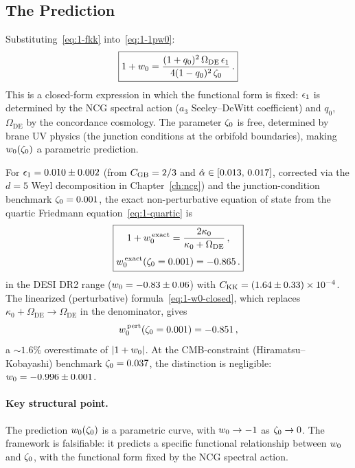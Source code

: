 \subsection{The Prediction}
\label{sec:1-prediction-w0}

Substituting~\eqref{eq:1-fkk} into~\eqref{eq:1-1pw0}:
\begin{equation}
\label{eq:1-w0-closed}
\boxed{1 + w_0 = \frac{(1+q_0)^2\,\Omega_{\mathrm{DE}}\,\epsilon_1}{4(1 - q_0)^2\,\zeta_0}\,.}
\end{equation}
This is a closed-form expression in which the functional form is fixed: $\epsilon_1$ is determined by the NCG spectral action ($a_3$ Seeley--DeWitt coefficient) and $q_0$, $\Omega_{\mathrm{DE}}$ by the concordance cosmology. The parameter $\zeta_0$ is free, determined by brane UV physics (the junction conditions at the orbifold boundaries), making $w_0(\zeta_0)$ a parametric prediction.

For $\epsilon_1 = 0.010 \pm 0.002$ (from $C_{\mathrm{GB}} = 2/3$ and $\hat{\alpha} \in [0.013,\, 0.017]$, corrected via the $d = 5$ Weyl decomposition in Chapter~\ref{ch:ncg}) and the junction-condition benchmark $\zeta_0 = 0.001$, the exact non-perturbative equation of state from the quartic Friedmann equation~\eqref{eq:1-quartic} is
\begin{equation}
\label{eq:1-w0-nonpert}
\boxed{\begin{gathered}
1 + w_0^{\,\mathrm{exact}} = \frac{2\kappa_0}{\kappa_0 + \Omega_{\mathrm{DE}}}\,,\\[4pt]
w_0^{\,\mathrm{exact}}(\zeta_0 = 0.001) = -0.865\,.
\end{gathered}}
\end{equation}
in the DESI DR2 range ($w_0 = -0.83 \pm 0.06$) with $C_{\mathrm{KK}} = (1.64 \pm 0.33) \times 10^{-4}$. The linearized (perturbative) formula~\eqref{eq:1-w0-closed}, which replaces $\kappa_0 + \Omega_{\mathrm{DE}} \to \Omega_{\mathrm{DE}}$ in the denominator, gives
\begin{equation}
\label{eq:1-w0-value}
w_0^{\,\mathrm{pert}}(\zeta_0 = 0.001) = -0.851\,,
\end{equation}
a ${\sim}1.6\%$ overestimate of $|1 + w_0|$. At the CMB-constraint (Hiramatsu--Kobayashi) benchmark $\zeta_0 = 0.037$, the distinction is negligible: $w_0 = -0.996 \pm 0.001$.

\paragraph{Key structural point.} The prediction $w_0(\zeta_0)$ is a parametric curve, with $w_0 \to -1$ as $\zeta_0 \to 0$. The framework is falsifiable: it predicts a specific functional relationship between $w_0$ and $\zeta_0$, with the functional form fixed by the NCG spectral action.

